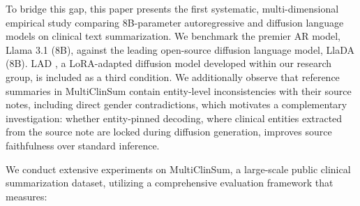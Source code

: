 \documentclass[11pt]{article}
\begin{document}
To bridge this gap, this paper presents the first systematic, multi-dimensional empirical study comparing 8B-parameter autoregressive and diffusion language models on clinical text summarization. We benchmark the premier AR model, Llama 3.1 (8B), against the leading open-source diffusion language model, LlaDA (8B). LAD \citep{kuiper2025lad}, a LoRA-adapted diffusion model developed within our research group, is included as a third condition. We additionally observe that reference summaries in MultiClinSum contain entity-level inconsistencies with their source notes, including direct gender contradictions, which motivates a complementary investigation: whether entity-pinned decoding, where clinical entities extracted from the source note are locked during diffusion generation, improves source faithfulness over standard inference.

We conduct extensive experiments on MultiClinSum, a large-scale public clinical summarization dataset, utilizing a comprehensive evaluation framework that measures: 
\end{document}
